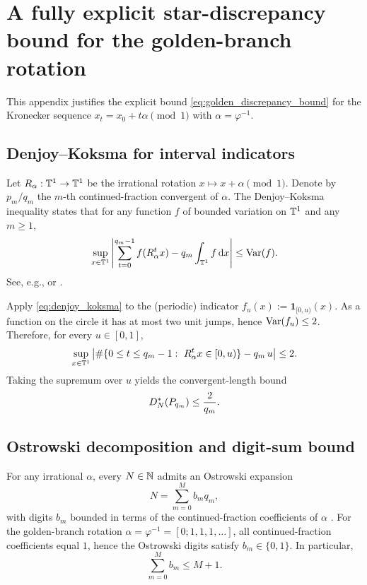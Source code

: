 
\section{A fully explicit star-discrepancy bound for the golden-branch rotation}
\label{app:rotation_discrepancy_golden}

This appendix justifies the explicit bound \eqref{eq:golden_discrepancy_bound} for the Kronecker sequence $x_t=x_0+t\alpha\pmod 1$ with $\alpha=\varphi^{-1}$.

\subsection{Denjoy--Koksma for interval indicators}
\label{app:dk_indicator}

Let $R_\alpha:\mathbb{T}^1\to\mathbb{T}^1$ be the irrational rotation $x\mapsto x+\alpha\pmod 1$.
Denote by $p_m/q_m$ the $m$-th continued-fraction convergent of $\alpha$.
The Denjoy--Koksma inequality states that for any function $f$ of bounded variation on $\mathbb{T}^1$ and any $m\ge 1$,
\begin{equation}
\label{eq:denjoy_koksma}
\sup_{x\in\mathbb{T}^1}
\left|
\sum_{t=0}^{q_m-1} f(R_\alpha^t x)
-
q_m\int_{\mathbb{T}^1} f\,\mathrm{d} x
\right|
\le \mathrm{Var}(f).
\end{equation}
See, e.g., \cite[Chapter~2]{KuipersNiederreiter1974} or \cite[Chapter~1]{DrmotaTichy1997}.

Apply \eqref{eq:denjoy_koksma} to the (periodic) indicator $f_u(x):=\mathbf{1}_{[0,u)}(x)$.
As a function on the circle it has at most two unit jumps, hence $\mathrm{Var}(f_u)\le 2$.
Therefore, for every $u\in[0,1]$,
\[
\sup_{x\in\mathbb{T}^1}
\left|
\#\{0\le t\le q_m-1:\ R_\alpha^t x\in[0,u)\}
-q_m\,u
\right|
\le 2.
\]
Taking the supremum over $u$ yields the convergent-length bound
\begin{equation}
\label{eq:discrepancy_at_convergents}
D_N^\ast(P_{q_m})\le \frac{2}{q_m}.
\end{equation}

\subsection{Ostrowski decomposition and digit-sum bound}
\label{app:ostrowski_digit_sum}

For any irrational $\alpha$, every $N\in\mathbb{N}$ admits an Ostrowski expansion
\[
N=\sum_{m=0}^M b_m q_m,
\]
with digits $b_m$ bounded in terms of the continued-fraction coefficients of $\alpha$ \cite[Chapter~3]{DrmotaTichy1997}.
For the golden-branch rotation $\alpha=\varphi^{-1}=[0;1,1,1,\dots]$, all continued-fraction coefficients equal $1$, hence the Ostrowski digits satisfy $b_m\in\{0,1\}$.
In particular,
\begin{equation}
\label{eq:digit_sum_bound}
\sum_{m=0}^M b_m\le M+1.
\end{equation}

